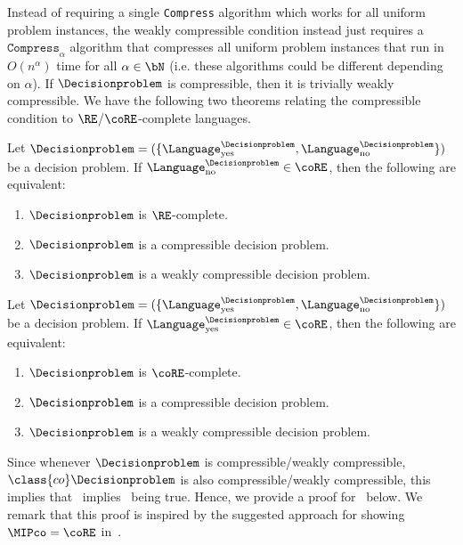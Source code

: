 Instead of requiring a single \texttt{Compress} algorithm which works for all uniform problem instances, the weakly compressible condition instead just requires a $\texttt{Compress}_{\alpha}$ algorithm that compresses all uniform problem instances that run in $O(n^{\alpha})$ time for all $\alpha \in \bN$ (i.e. these algorithms could be different depending on $\alpha$). If $\Decisionproblem$ is compressible, then it is trivially weakly compressible. We have the following two theorems relating the compressible condition to $\RE$/$\coRE$-complete languages.

\begin{theorem} \label{thm:compressRE}
	Let $\Decisionproblem = (\{\Language_{\text{yes}}^\Decisionproblem, \Language_{\text{no}}^\Decisionproblem\})$ be a decision problem. If $\Language_{\text{no}}^\Decisionproblem \in \coRE$, then the following are equivalent:
	\begin{enumerate}
		\item $\Decisionproblem$ is $\RE$-complete. 
		\item $\Decisionproblem$ is a compressible decision problem.
		\item $\Decisionproblem$ is a weakly compressible decision problem.
	\end{enumerate}
\end{theorem}

\begin{theorem} \label{thm:compresscosRE}
		Let $\Decisionproblem = (\{\Language_{\text{yes}}^\Decisionproblem, \Language_{\text{no}}^\Decisionproblem\})$ be a decision problem. If $\Language_{\text{yes}}^\Decisionproblem \in \coRE$, then the following are equivalent:
		\begin{enumerate}
		\item $\Decisionproblem$ is $\coRE$-complete. 
		\item $\Decisionproblem$ is a compressible decision problem.
		\item $\Decisionproblem$ is a weakly compressible decision problem.
	\end{enumerate}
\end{theorem}

Since whenever $\Decisionproblem$ is compressible/weakly compressible, $\class{co}\Decisionproblem$ is also compressible/weakly compressible, this implies that~ implies~ being true. Hence, we provide a proof for~ below. We remark that this proof is inspired by the suggested approach for showing $\MIPco=\coRE$ in~\cite[Conjecture 1.4]{mousaviNonlocalGamesCompression2022}. 

